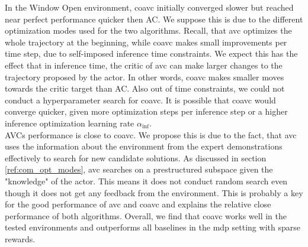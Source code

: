 In the Window Open environment, \ac{coavc} initially converged slower but 
reached near perfect performance quicker then AC. We suppose this is due to the different optimization modes used for the two algorithms. Recall, that \ac{avc} optimizes the whole 
trajectory at the beginning, while \ac{coavc} makes small improvements per time step, due to self-imposed inference time constraints. We expect this has the effect that in inference time, the critic of 
\ac{avc} can make larger changes to the trajectory proposed by the actor. In other words, \ac{coavc} makes smaller moves towards the critic target than AC. Also out of time constraints, we could 
not conduct a hyperparameter search for \ac{coavc}. It is possible that \ac{coavc} would converge quicker, given more optimization steps per inference step or a higher inference optimization 
learning rate $\alpha_{\mathrm{inf}}$.\\ 

AVCs performance is close to \ac{coavc}. We propose this is due to the fact, that \ac{avc} uses the information about the environment 
from the expert demonstrations effectively to search for new candidate solutions. As discussed in section \ref{ref:com_opt_modes}, \ac{avc} searches on a prestructured subspace given the "knowledge" of the 
actor. This means it does not conduct random search even though it does not get any feedback from the environment. This is probably a key for the good performance of \ac{avc} and \ac{coavc} and explains 
the relative close performance of both algorithms. Overall, we find that \ac{coavc} works well in the tested environments and outperforms all baselines in the \ac{mdp} setting with sparse rewards.